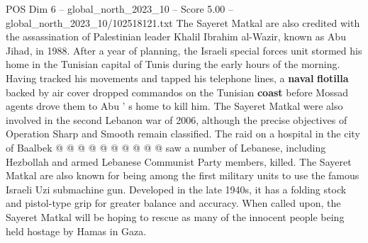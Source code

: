 \begin{textsample}{POS Dim 6 – global\_north\_2023\_10 – Score 5.00 – global\_north\_2023\_10/102518121.txt}
The Sayeret Matkal are also credited with the assassination of Palestinian leader Khalil Ibrahim al-Wazir, known as Abu Jihad, in 1988.
After a year of planning, the Israeli special forces unit stormed his home in the Tunisian capital of Tunis during the early hours of the morning.
Having tracked his movements and tapped his telephone lines, a \textbf{naval} \textbf{flotilla} backed by air cover dropped commandos on the Tunisian \textbf{coast} before Mossad agents drove them to Abu ' s home to kill him.
The Sayeret Matkal were also involved in the second Lebanon war of 2006, although the precise objectives of Operation Sharp and Smooth remain classified.
The raid on a hospital in the city of Baalbek @ @ @ @ @ @ @ @ @ @ saw a number of Lebanese, including Hezbollah and armed Lebanese Communist Party members, killed.
The Sayeret Matkal are also known for being among the first military units to use the famous Israeli Uzi submachine gun.
Developed in the late 1940s, it has a folding stock and pistol-type grip for greater balance and accuracy.
When called upon, the Sayeret Matkal will be hoping to rescue as many of the innocent people being held hostage by Hamas in Gaza.

\end{textsample}
